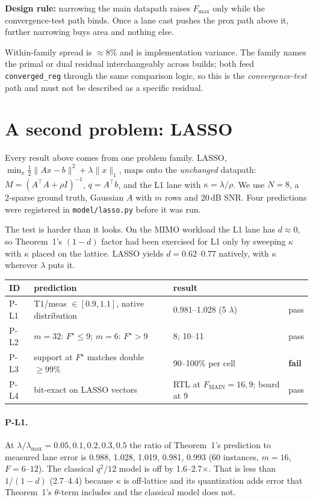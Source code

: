 \documentclass[11pt,a4paper]{article}
\begin{document}
\textbf{Design rule:} narrowing the main datapath raises $F_{\max}$ only while
the convergence-test path binds. Once a lane cast pushes the prox path above
it, further narrowing buys area and nothing else.

Within-family spread is $\approx 8\%$ and is implementation variance. The
family names the primal or dual residual interchangeably across builds; both
feed \texttt{converged\_reg} through the same comparison logic, so this is the
\emph{convergence-test} path and must not be described as a specific residual.

\section{A second problem: LASSO}
\label{sec:lasso}

Every result above comes from one problem family. LASSO,
$\min_x \tfrac12\|Ax-b\|^2+\lambda\|x\|_1$, maps onto the \emph{unchanged}
datapath: $M=(A^\top A+\rho I)^{-1}$, $q=A^\top b$, and the L1 lane with
$\kappa=\lambda/\rho$. We use $N=8$, a 2-sparse ground truth, Gaussian $A$ with
$m$ rows and 20\,dB SNR. Four predictions were registered in
\texttt{model/lasso.py} before it was run.

The test is harder than it looks. On the MIMO workload the L1 lane has
$d\approx0$, so Theorem~1's $(1-d)$ factor had been exercised for L1 only by
sweeping $\kappa$ with $\kappa$ placed on the lattice. LASSO yields
$d=0.62$--$0.77$ natively, with $\kappa$ wherever $\lambda$ puts it.

\begin{center}\small
\begin{tabular}{llll}
\toprule
ID & prediction & result & \\
\midrule
P-L1 & T1/meas $\in[0.9,1.1]$, native distribution & 0.981--1.028 (5 $\lambda$) & pass \\
P-L2 & $m{=}32$: $F^\star\le9$; $m{=}6$: $F^\star>9$ & 8; 10--11 & pass \\
P-L3 & support at $F^\star$ matches double $\ge99\%$ & 90--100\% per cell & \textbf{fail} \\
P-L4 & bit-exact on LASSO vectors & RTL at $F_{\text{MAIN}}=16,9$; board at 9 & pass \\
\bottomrule
\end{tabular}
\end{center}

\paragraph{P-L1.} At $\lambda/\lambda_{\max}=0.05,0.1,0.2,0.3,0.5$ the ratio of
Theorem~1's prediction to measured lane error is 0.988, 1.028, 1.019, 0.981,
0.993 (60 instances, $m=16$, $F=6$--$12$). The classical $q^2/12$ model is off
by 1.6--2.7$\times$. That is less than $1/(1-d)$ (2.7--4.4) because $\kappa$ is
off-lattice and its quantization adds error that Theorem~1's $\theta$-term
includes and the classical model does not.
\end{document}
